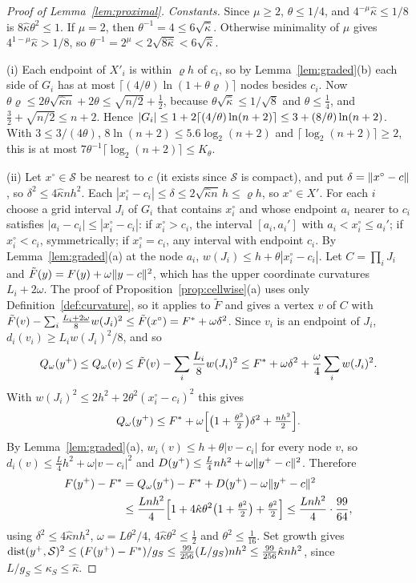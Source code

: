 \begin{proof}[Proof of Lemma~\ref{lem:proximal}]
\emph{Constants.} Since $\mu\ge2$, $\theta\le1/4$, and
$4^{-\mu}\hat\kappa\le1/8$ is $8\hat\kappa\theta^2\le1$. If $\mu=2$, then
$\theta^{-1}=4\le6\sqrt{\hat\kappa}$. Otherwise minimality of $\mu$ gives
$4^{1-\mu}\hat\kappa>1/8$, so $\theta^{-1}=2^\mu<2\sqrt{8\hat\kappa}
<6\sqrt{\hat\kappa}$.

(i) Each endpoint of $X'_i$ is within $\varrho h$ of $c_i$, so by
Lemma~\ref{lem:graded}(b) each side of $G_i$ has at most
$\lceil(4/\theta)\ln(1+\theta\varrho)\rceil$ nodes besides $c_i$. Now
$\theta\varrho\le2\theta\sqrt{\hat\kappa n}+2\theta\le\sqrt{n/2}+\frac12$,
because $\theta\sqrt{\hat\kappa}\le1/\sqrt8$ and $\theta\le\frac14$, and
$\frac32+\sqrt{n/2}\le n+2$. Hence
$\lvert G_i\rvert\le1+2\lceil(4/\theta)\ln(n+2)\rceil\le3+(8/\theta)\ln(n+2)$. With
$3\le3/(4\theta)$, $8\ln(n+2)\le5.6\log_2(n+2)$ and
$\lceil\log_2(n+2)\rceil\ge2$, this is at most
$7\theta^{-1}\lceil\log_2(n+2)\rceil\le K_\theta$.

(ii) Let $x^\circ\in\mathcal S$ be nearest to $c$ (it exists since $\mathcal S$
is compact), and put $\delta=\lVert x^\circ-c\rVert$, so
$\delta^2\le4\hat\kappa nh^2$. Each
$|x^\circ_i-c_i|\le\delta\le2\sqrt{\hat\kappa n}\,h\le\varrho h$, so
$x^\circ\in X'$. For each $i$ choose a grid interval $J_i$ of $G_i$ that
contains $x^\circ_i$ and
whose endpoint $a_i$ nearer to $c_i$ satisfies $|a_i-c_i|\le|x^\circ_i-c_i|$:
if $x^\circ_i>c_i$, the interval $[a_i,a_i']$ with $a_i<x^\circ_i\le a_i'$; if
$x^\circ_i<c_i$, symmetrically; if $x^\circ_i=c_i$, any interval with endpoint
$c_i$. By Lemma~\ref{lem:graded}(a) at the node $a_i$,
$w(J_i)\le h+\theta|x^\circ_i-c_i|$. Let $C=\prod_iJ_i$ and
$\tilde F(y)=F(y)+\omega\lVert y-c\rVert^2$, which has the upper coordinate
curvatures $L_i+2\omega$. The proof of Proposition~\ref{prop:cellwise}(a) uses
only Definition~\ref{def:curvature}, so it applies to $\tilde F$ and gives a
vertex $v$ of $C$ with
$\tilde F(v)-\sum_i\frac{L_i+2\omega}8w(J_i)^2\le\tilde F(x^\circ)=F^{*}+\omega\delta^2$.
Since $v_i$ is an endpoint of $J_i$, $d_i(v_i)\ge L_iw(J_i)^2/8$, and so
\[
Q_\omega(y^+)\le Q_\omega(v)\le\tilde F(v)-\sum_i\frac{L_i}8w(J_i)^2
\le F^{*}+\omega\delta^2+\frac\omega4\sum_iw(J_i)^2 .
\]
With $w(J_i)^2\le2h^2+2\theta^2(x^\circ_i-c_i)^2$ this gives
\[
Q_\omega(y^+)\le F^{*}+\omega\Bigl[\bigl(1+\tfrac{\theta^2}2\bigr)\delta^2
+\tfrac{nh^2}2\Bigr].
\]
By Lemma~\ref{lem:graded}(a), $w_i(v)\le h+\theta|v-c_i|$ for every node $v$,
so $d_i(v)\le\frac L4h^2+\omega|v-c_i|^2$ and
$D(y^+)\le\frac L4nh^2+\omega\lVert y^+-c\rVert^2$. Therefore
\begin{align*}
F(y^+)-F^{*}&=Q_\omega(y^+)-F^{*}+D(y^+)-\omega\lVert y^+-c\rVert^2\\
&\le\frac{Lnh^2}4\Bigl[1+4\hat\kappa\theta^2\bigl(1+\tfrac{\theta^2}2\bigr)
+\tfrac{\theta^2}2\Bigr]\le\frac{Lnh^2}4\cdot\frac{99}{64},
\end{align*}
using $\delta^2\le4\hat\kappa nh^2$, $\omega=L\theta^2/4$,
$4\hat\kappa\theta^2\le\frac12$ and $\theta^2\le\frac1{16}$. Set growth gives
$\operatorname{dist}(y^+,\mathcal S)^2\le(F(y^+)-F^{*})/g_S\le\frac{99}{256}(L/g_S)nh^2\le
\frac{99}{256}\hat\kappa nh^2$, since $L/g_S\le\kappa_S\le\hat\kappa$.


\end{proof}
